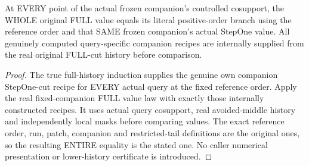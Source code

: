 \begin{theorem}
\label{hir:original-full-cut-frozen-companion-value-law}
\leanok
At EVERY point of the actual frozen companion's controlled cosupport, the
WHOLE original FULL value equals its literal positive-order branch using
the reference order and that SAME frozen companion's actual StepOne value.
All genuinely computed query-specific companion recipes are internally
supplied from the real original FULL-cut history before comparison.
\end{theorem}
\begin{proof}
The true full-history induction supplies the genuine own companion
StepOne-cut recipe for EVERY actual query at the fixed reference order.
Apply the real fixed-companion FULL value law with exactly those internally
constructed recipes. It uses actual query cosupport, real avoided-middle
history and independently local masks before comparing values. The exact
reference order, run, patch, companion and restricted-tail definitions are
the original ones, so the resulting ENTIRE equality is the stated one.
No caller numerical presentation or lower-history certificate is introduced.
\end{proof}

